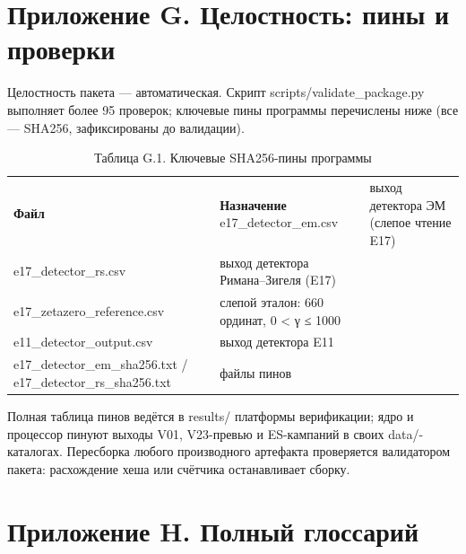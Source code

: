\documentclass[11pt,a4paper]{article}
\begin{document}
\section{Приложение G. Целостность: пины и проверки}

Целостность пакета — автоматическая. Скрипт scripts/validate\_package.py выполняет более 95 проверок; ключевые пины программы перечислены ниже (все — SHA256, зафиксированы до валидации).

\begin{table}[htbp]\centering\small
\caption{Таблица G.1. Ключевые SHA256-пины программы}
\begin{tabular}{p{} p{}}
\toprule
\textbf{Файл} & \textbf{Назначение}
\midrule
e17\_detector\_em.csv & выход детектора ЭМ (слепое чтение E17) \\
e17\_detector\_rs.csv & выход детектора Римана–Зигеля (E17) \\
e17\_zetazero\_reference.csv & слепой эталон: 660 ординат, 0 < γ ≤ 1000 \\
e11\_detector\_output.csv & выход детектора E11 \\
e17\_detector\_em\_sha256.txt / e17\_detector\_rs\_sha256.txt & файлы пинов \\
\bottomrule
\end{tabular}
\end{table}

Полная таблица пинов ведётся в results/ платформы верификации; ядро и процессор пинуют выходы V01, V23-превью и ES-кампаний в своих data/-каталогах. Пересборка любого производного артефакта проверяется валидатором пакета: расхождение хеша или счётчика останавливает сборку.

\section{Приложение H. Полный глоссарий}
\end{document}
